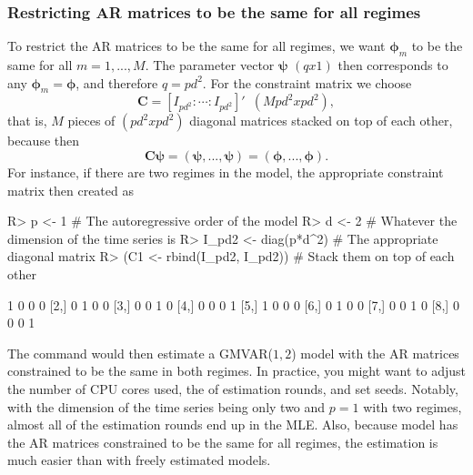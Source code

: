 \documentclass[nojss]{jss}
\begin{document}
\subsubsection{Restricting AR matrices to be the same for all regimes}

To restrict the AR matrices to be the same for all regimes, we want $\boldsymbol{\phi}_m$ to be the same for all $m=1,...,M$. The parameter vector $\boldsymbol{\psi}$ $(qx1)$ then corresponds to any $\boldsymbol{\phi}_m=\boldsymbol{\phi}$, and therefore $q=pd^2$. For the constraint matrix we choose
\begin{equation}
\boldsymbol{C} = [I_{pd^2}:\cdots:I_{pd^2}]' \enspace (Mpd^2xpd^2),
\end{equation}
that is, $M$ pieces of $(pd^2xpd^2)$ diagonal matrices stacked on top of each other, because then
\begin{equation}
\boldsymbol{C}\boldsymbol{\psi}=(\boldsymbol{\psi},...,\boldsymbol{\psi})=(\boldsymbol{\phi},...,\boldsymbol{\phi}).
\end{equation}
For instance, if there are two regimes in the model, the appropriate constraint matrix then created as
%
\begin{CodeChunk}
\begin{CodeInput}
R> p <- 1 # The autoregressive order of the model
R> d <- 2 # Whatever the dimension of the time series is
R> I_pd2 <- diag(p*d^2) # The appropriate diagonal matrix
R> (C1 <- rbind(I_pd2, I_pd2)) # Stack them on top of each other
\end{CodeInput}
\begin{CodeOutput}
     [,1] [,2] [,3] [,4]
[1,]    1    0    0    0
[2,]    0    1    0    0
[3,]    0    0    1    0
[4,]    0    0    0    1
[5,]    1    0    0    0
[6,]    0    1    0    0
[7,]    0    0    1    0
[8,]    0    0    0    1
\end{CodeOutput}
\end{CodeChunk}
%
The command  would then estimate a GMVAR($1,2$) model with the AR matrices constrained to be the same in both regimes. In practice, you might want to adjust the number of CPU cores used, the of estimation rounds, and set seeds. Notably, with the dimension of the time series being only two and $p=1$ with two regimes, almost all of the estimation rounds end up in the MLE. Also, because model has the AR matrices constrained to be the same for all regimes, the estimation is much easier than with freely estimated models.
\end{document}
